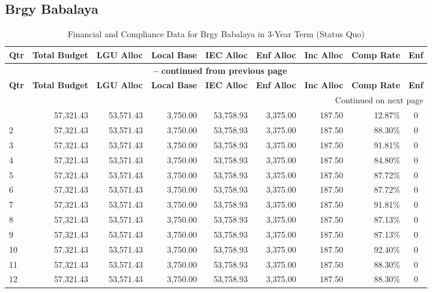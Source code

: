 \subsection{Brgy Babalaya}
\begin{longtable}{lrrrrrrrc}
\caption{Financial and Compliance Data for Brgy Babalaya in 3-Year Term (Status Quo)} \\
\toprule
\textbf{Qtr} & \textbf{Total Budget} & \textbf{LGU Alloc} & \textbf{Local Base} & \textbf{IEC Alloc} & \textbf{Enf Alloc} & \textbf{Inc Alloc} & \textbf{Comp Rate} & \textbf{Enf} \\
\midrule
\endfirsthead
\multicolumn{9}{c}{{\bfseries \tablename\ \thetable{} -- continued from previous page}} \\
\toprule
\textbf{Qtr} & \textbf{Total Budget} & \textbf{LGU Alloc} & \textbf{Local Base} & \textbf{IEC Alloc} & \textbf{Enf Alloc} & \textbf{Inc Alloc} & \textbf{Comp Rate} & \textbf{Enf} \\
\midrule
\endhead
\hline \multicolumn{9}{r}{{Continued on next page}} \\ \hline
\endfoot
\bottomrule
\endlastfoot
1 & 57,321.43 & 53,571.43 & 3,750.00 & 53,758.93 & 3,375.00 & 187.50 & 12.87\% & 0 \\
2 & 57,321.43 & 53,571.43 & 3,750.00 & 53,758.93 & 3,375.00 & 187.50 & 88.30\% & 0 \\
3 & 57,321.43 & 53,571.43 & 3,750.00 & 53,758.93 & 3,375.00 & 187.50 & 91.81\% & 0 \\
4 & 57,321.43 & 53,571.43 & 3,750.00 & 53,758.93 & 3,375.00 & 187.50 & 84.80\% & 0 \\
5 & 57,321.43 & 53,571.43 & 3,750.00 & 53,758.93 & 3,375.00 & 187.50 & 87.72\% & 0 \\
6 & 57,321.43 & 53,571.43 & 3,750.00 & 53,758.93 & 3,375.00 & 187.50 & 87.72\% & 0 \\
7 & 57,321.43 & 53,571.43 & 3,750.00 & 53,758.93 & 3,375.00 & 187.50 & 91.81\% & 0 \\
8 & 57,321.43 & 53,571.43 & 3,750.00 & 53,758.93 & 3,375.00 & 187.50 & 87.13\% & 0 \\
9 & 57,321.43 & 53,571.43 & 3,750.00 & 53,758.93 & 3,375.00 & 187.50 & 87.13\% & 0 \\
10 & 57,321.43 & 53,571.43 & 3,750.00 & 53,758.93 & 3,375.00 & 187.50 & 92.40\% & 0 \\
11 & 57,321.43 & 53,571.43 & 3,750.00 & 53,758.93 & 3,375.00 & 187.50 & 88.30\% & 0 \\
12 & 57,321.43 & 53,571.43 & 3,750.00 & 53,758.93 & 3,375.00 & 187.50 & 88.30\% & 0 \\
\end{longtable}
\clearpage


